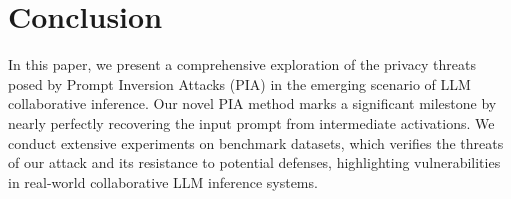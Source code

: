 
\vspace{-0.3em}
\section{Conclusion}
\vspace{-0.2em}
 


In this paper, we present a comprehensive exploration of the privacy threats posed by Prompt Inversion Attacks (PIA) in the emerging scenario of LLM collaborative inference. Our novel PIA method marks a significant milestone by nearly perfectly recovering the input prompt from intermediate activations. 
We conduct extensive experiments on benchmark datasets, which verifies the threats of our attack and its resistance to potential defenses,  highlighting vulnerabilities in real-world collaborative LLM inference systems.


